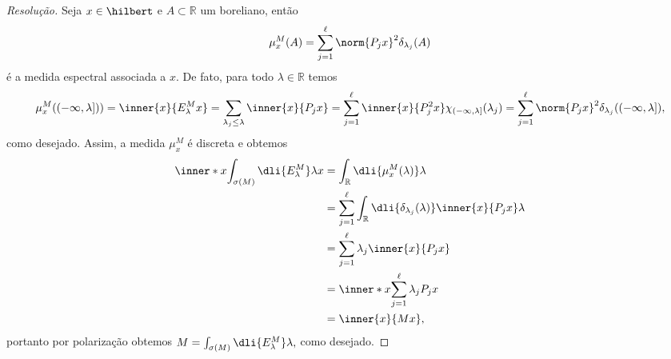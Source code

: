 \begin{proof}[Resolução]
  Seja \(x \in \hilbert\) e \(A \subset \mathbb{R}\) um boreliano, então
  \begin{equation*}
    \mu^M_x(A) = \sum_{j = 1}^\ell \norm{P_jx}^2\delta_{\lambda_j}(A)
  \end{equation*}
  é a medida espectral associada a \(x.\) De fato, para todo \(\lambda \in \mathbb{R}\) temos
  \begin{equation*}
    \mu^M_x((-\infty,\lambda])) = \inner{x}{E_\lambda^Mx} = \sum_{\lambda_j \leq \lambda} \inner{x}{P_j x} = \sum_{j = 1}^\ell \inner{x}{P_j^2x} \chi_{(-\infty, \lambda]}(\lambda_j) = \sum_{j = 1}^\ell \norm{P_jx}^2 \delta_{\lambda_j}((-\infty, \lambda]),
  \end{equation*}
  como desejado. Assim, a medida \(\mu_x^M\) é discreta e obtemos
  \begin{align*}
    \inner*{x}{\int_{\sigma(M)}\dli{E_\lambda^M}\lambda x}
    &= \int_{\mathbb{R}}\dli{\mu^M_x(\lambda)} \lambda\\
    &= \sum_{j = 1}^\ell{\int_{\mathbb{R}}\dli{\delta_{\lambda_j}(\lambda)} \inner{x}{P_jx}\lambda}\\
    &= \sum_{j = 1}^\ell{\lambda_j \inner{x}{P_jx}}\\
    &= \inner*{x}{\sum_{j=1}^\ell{\lambda_jP_j x}}\\
    &= \inner{x}{Mx},
  \end{align*}
  portanto por polarização obtemos \(M = \int_{\sigma(M)}\dli{E_\lambda^M}\lambda,\) como desejado.
\end{proof}
